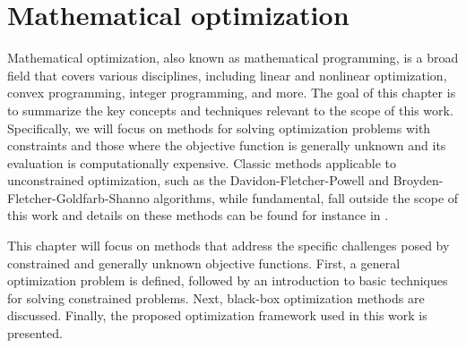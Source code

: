 \chapter{Mathematical optimization}\label{optimization}

Mathematical optimization, also known as mathematical programming, is a broad field that covers various disciplines, including linear and nonlinear optimization, convex programming, integer programming, and more. The goal of this chapter is to summarize the key concepts and techniques relevant to the scope of this work. Specifically, we will focus on methods for solving optimization problems with constraints and those where the objective function is generally unknown and its evaluation is computationally expensive. Classic methods applicable to unconstrained optimization, such as the Davidon-Fletcher-Powell \cite{Fletcher1963} and Broyden-Fletcher-Goldfarb-Shanno \cite{broyden1970} algorithms, while fundamental, fall outside the scope of this work and details on these methods can be found for instance in \cite{Bert}.

This chapter will focus on methods that address the specific challenges posed by constrained and generally unknown objective functions. First, a general optimization problem is defined, followed by an introduction to basic techniques for solving constrained problems. Next, black-box optimization methods are discussed. Finally, the proposed optimization framework used in this work is presented.




%
